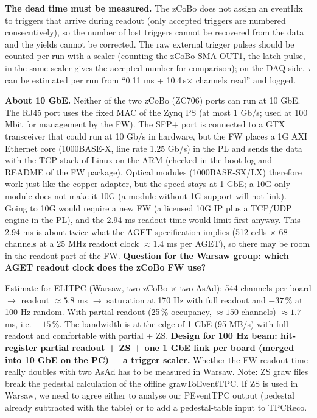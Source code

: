\documentclass[a4paper,11pt]{article}
\newcommand{\us}{\,\textmu s}
\begin{document}
\textbf{The dead time must be measured.} The zCoBo does not assign an eventIdx to triggers that arrive during readout (only accepted triggers are numbered consecutively), so the number of lost triggers cannot be recovered from the data and the yields cannot be corrected. The raw external trigger pulses should be counted per run with a scaler (counting the zCoBo SMA OUT1, the latch pulse, in the same scaler gives the accepted number for comparison); on the DAQ side, $\tau$ can be estimated per run from ``0.11 ms + 10.4\us $\times$ channels read'' and logged.

\textbf{About 10 GbE.} Neither of the two zCoBo (ZC706) ports can run at 10 GbE. The RJ45 port uses the fixed MAC of the Zynq PS (at most 1 Gb/s; used at 100 Mbit for management by the FW). The SFP+ port is connected to a GTX transceiver that could run at 10 Gb/s in hardware, but the FW places a 1G AXI Ethernet core (1000BASE-X, line rate 1.25 Gb/s) in the PL and sends the data with the TCP stack of Linux on the ARM (checked in the boot log and README of the FW package). Optical modules (1000BASE-SX/LX) therefore work just like the copper adapter, but the speed stays at 1 GbE; a 10G-only module does not make it 10G (a module without 1G support will not link).
Going to 10G would require a new FW (a licensed 10G IP plus a TCP/UDP engine in the PL), and the 2.94 ms readout time would limit first anyway. This 2.94 ms is about twice what the AGET specification implies (512 cells $\times$ 68 channels at a 25 MHz readout clock $\approx 1.4$ ms per AGET), so there may be room in the readout part of the FW. \textbf{Question for the Warsaw group: which AGET readout clock does the zCoBo FW use?}

Estimate for ELITPC (Warsaw, two zCoBo $\times$ two AsAd): 544 channels per board $\to$ readout $\approx 5.8$ ms $\to$ saturation at 170 Hz with full readout and $-37$\,\% at 100 Hz random. With partial readout (25\,\% occupancy, $\approx 150$ channels) $\approx 1.7$ ms, i.e.\ $-15$\,\%.
The bandwidth is at the edge of 1 GbE (95 MB/s) with full readout and comfortable with partial + ZS. \textbf{Design for 100 Hz beam: hit-register partial readout + ZS + one 1 GbE link per board (merged into 10 GbE on the PC) + a trigger scaler.} Whether the FW readout time really doubles with two AsAd has to be measured in Warsaw.
Note: ZS graw files break the pedestal calculation of the offline grawToEventTPC. If ZS is used in Warsaw, we need to agree either to analyse our PEventTPC output (pedestal already subtracted with the table) or to add a pedestal-table input to TPCReco.
\end{document}
